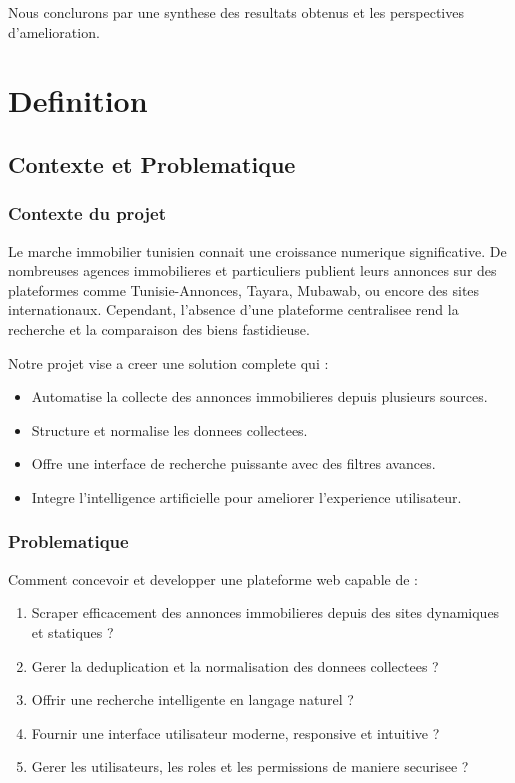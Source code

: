 \documentclass[12pt,a4paper]{report}
\begin{document}
Nous conclurons par une synthese des resultats obtenus et les perspectives d'amelioration.

\part{Definition}

\chapter{Contexte et Problematique}

\section{Contexte du projet}

Le marche immobilier tunisien connait une croissance numerique significative. De nombreuses agences immobilieres et particuliers publient leurs annonces sur des plateformes comme Tunisie-Annonces, Tayara, Mubawab, ou encore des sites internationaux. Cependant, l'absence d'une plateforme centralisee rend la recherche et la comparaison des biens fastidieuse.

Notre projet vise a creer une solution complete qui :
\begin{itemize}
  \item Automatise la collecte des annonces immobilieres depuis plusieurs sources.
  \item Structure et normalise les donnees collectees.
  \item Offre une interface de recherche puissante avec des filtres avances.
  \item Integre l'intelligence artificielle pour ameliorer l'experience utilisateur.
\end{itemize}

\section{Problematique}

Comment concevoir et developper une plateforme web capable de :
\begin{enumerate}
  \item Scraper efficacement des annonces immobilieres depuis des sites dynamiques et statiques ?
  \item Gerer la deduplication et la normalisation des donnees collectees ?
  \item Offrir une recherche intelligente en langage naturel ?
  \item Fournir une interface utilisateur moderne, responsive et intuitive ?
  \item Gerer les utilisateurs, les roles et les permissions de maniere securisee ?
\end{enumerate}
\end{document}
